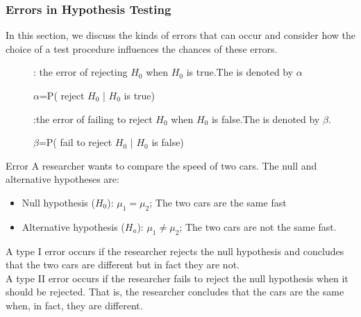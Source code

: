 \subsubsection{Errors in Hypothesis Testing}
In this section, we discuss
the kinds of errors that can occur and consider how the choice of a test procedure
influences the chances of these errors.
\begin{description}
    \item[]: the error of rejecting \(H_0\) when \(H_0\) is true.The \textbf{} is denoted by \(\alpha\)
    \begin{center}
        \(\alpha\)=P( reject \(H_{0}\) | \(H_{0}\) is true)
    \end{center}
    \item[]:the error of failing to reject \(H_0\) when \(H_0\) is false.The \textbf{} is denoted by \(\beta\).
    \begin{center}
        \(\beta\)=P( fail to reject \(H_{0}\) | \(H_{0}\) is false)
    \end{center}
\end{description}
\begin{examplebox}{Error}
    A researcher wants to compare the speed  of two cars. The null and alternative hypotheses are:
\begin{itemize}
    \item Null hypothesis (\(H_{0}\)): \(\mu_{1}=\mu_{2}\); The two cars are the same fast
\item Alternative hypothesis (\(H_{a}\)): \(\mu_{1}\neq \mu_{2}\); The two cars are not the same fast.
\end{itemize}
A type I error occurs if the researcher rejects the null hypothesis and concludes that the two cars are different but in fact they are not.  \\
A type II error occurs if the researcher fails to reject the null hypothesis when it should be rejected. That is, the researcher concludes that the cars are the same when, in fact, they are different. 
\end{examplebox}

